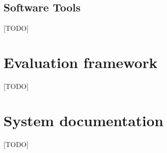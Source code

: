 \subsection{Software Tools}
[TODO]

\section{Evaluation framework} \label{sec:evaluationFramework}
[TODO]

\section{System documentation}

[TODO]
